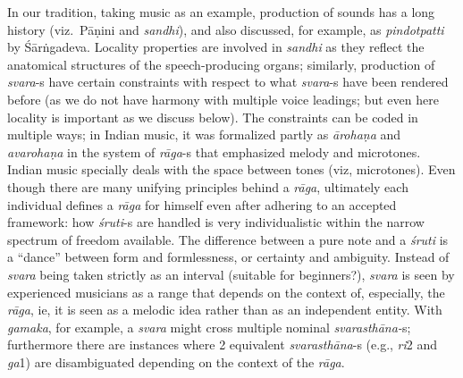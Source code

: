 In our tradition, taking music as an example, production of sounds has a long history (viz.~Pāṇini and \textsl{sandhi}), and also discussed, for example, as \textsl{pindotpatti} by Śārṅgadeva. Locality properties are involved in \textsl{sandhi} as they reflect the anatomical structures of the speech-producing organs; similarly, production of \textsl{svara}-s have certain constraints with respect to what \textsl{svara}-s have been rendered before (as we do not have harmony with multiple voice leadings; but even here locality is important as we discuss below). The constraints can be coded in multiple ways; in Indian music, it was formalized partly as \textsl{ārohaṇa} and \textsl{avarohaṇa} in the system of \textsl{rāga}-s that emphasized melody and microtones. Indian music specially deals with the space between tones (viz, microtones). Even though there are many unifying principles behind a \textsl{rāga}, ultimately each individual defines a \textsl{rāga} for himself even after adhering to an accepted framework: how \textsl{śruti}-s are handled is very individualistic within the narrow spectrum of freedom available. The difference between a pure note and a \textsl{śruti} is a “dance” between form and formlessness, or certainty and ambiguity. Instead of \textsl{svara} being taken strictly as an interval (suitable for beginners?), \textsl{svara} is seen by experienced musicians as a range that depends on the context of, especially, the \textsl{rāga}, ie, it is seen as a melodic idea rather than as an independent entity. With \textsl{gamaka}, for example, a \textsl{svara} might cross multiple nominal \textsl{svarasthāna-}s; furthermore there are instances where 2 equivalent \textsl{svarasthāna}-s (e.g., \textsl{ri}2 and \textsl{ga}1) are disambiguated depending on the context of the \textsl{rāga}.


